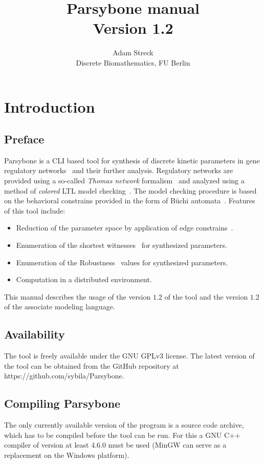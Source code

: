\documentclass[12pt]{article}
\title{Parsybone  manual \\ Version 1.2}
\author{Adam Streck \\
		Discrete Biomathematics, FU Berlin}
\begin{document}
\maketitle

\section{Introduction}
\subsection{Preface}
Parsybone is a CLI based tool for synthesis of discrete kinetic parameters in gene regulatory networks~\cite{TCBB2011} and their further analysis. Regulatory networks are provided using a so-called \emph{Thomas network} formalism~\cite{ThomasR1991} and analyzed using a method of \emph{colored} LTL model checking~\cite{TechReport}. The model checking procedure is based on the behavioral constrains provided in the form of B\"uchi automata~\cite{MCBible}. Features of this tool include:

\begin{itemize}
\item Reduction of the parameter space by application of edge constrains~\cite{TCBB2012}.
\item Enumeration of the shortest witnesses~\cite{TechReport} for synthesized parameters.
\item Enumeration of the \textrm{Robustness}~\cite{TechReport} values for synthesized parameters.
\item Computation in a distributed environment.
\end{itemize}

This manual describes the usage of the version $1.2$ of the tool and the version $1.2$ of the associate modeling language.

\subsection{Availability}
 The tool is freely available under the GNU GPLv3 license. The latest version of the tool can be obtained from the GitHub repository at https://github.com/sybila/Parsybone.

\subsection{Compiling Parsybone}
The only currently available version of the program is a source code archive, which has to be compiled before the tool can be run. For this a GNU C++ compiler of version at least 4.6.0 must be used (MinGW can serve as a replacement on the Windows platform).
\end{document}
